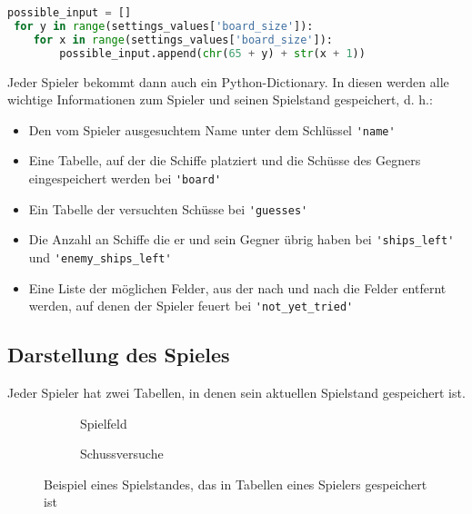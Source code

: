 \documentclass{article}
\begin{document}
\begin{lstlisting}[language=Python, caption = Herstellung einer Liste allen möglichen Felder, label=lst:possible input]
 possible_input = []
 for y in range(settings_values['board_size']):
    for x in range(settings_values['board_size']):
        possible_input.append(chr(65 + y) + str(x + 1))
\end{lstlisting}

    Jeder Spieler bekommt dann auch ein Python-Dictionary. In diesen werden alle wichtige Informationen zum Spieler und seinen Spielstand gespeichert, d. h.:

\setlist{}%
\begin{itemize}
\itemsep0em
  \item Den vom Spieler ausgesuchtem Name unter dem Schlüssel \verb$'name'$
  \item Eine Tabelle, auf der die Schiffe platziert und die Schüsse des Gegners eingespeichert werden bei \verb$'board'$
  \item Ein Tabelle der versuchten Schüsse bei \verb$'guesses'$
  \item Die Anzahl an Schiffe die er und sein Gegner übrig haben bei \verb$'ships_left'$ und \verb$'enemy_ships_left'$
  \item Eine Liste der möglichen Felder, aus der nach und nach die Felder entfernt werden, auf denen der Spieler feuert bei \verb$'not_yet_tried'$
\end{itemize}

\subsection{Darstellung des Spieles}
    Jeder Spieler hat zwei Tabellen, in denen sein aktuellen Spielstand gespeichert ist.

\begin{figure}[H]
    \begin{subfigure}{0.50\textwidth}
    \centering
    
    \caption{Spielfeld}
    \label{fig:board}
    \end{subfigure}
    \begin{subfigure}{0.50\textwidth}
    \centering
    
    \caption{Schussversuche}
    \label{fig:guesses}
\end{subfigure}
\caption{Beispiel eines Spielstandes, das in Tabellen eines Spielers gespeichert ist}
\label{fig:Boards}
\end{figure}
\end{document}
